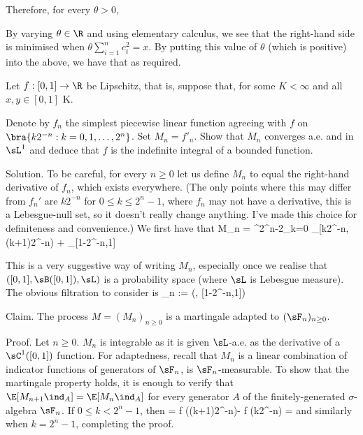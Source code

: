Therefore, for every $\theta > 0$,
\be
\pro{} \leq \exp{}
\ee

By varying $\theta \in \R$ and using elementary calculus, we see that the right-hand side is minimised when $\theta \sum^n_{i=1} c^2_i = x$. By putting this value of $\theta$ (which is positive) into the above, we have that
\be
\pro{} \leq  \exp{}
\ee
as required.

\vspace{2mm}

\qcutline


\item Let $f : [0, 1] \to \R$ be Lipschitz, that is, suppose that, for some $K < \infty$ and all $x, y \in [0, 1]$
\be
{} \leq K.
\ee

Denote by $f_n$ the simplest piecewise linear function agreeing with $f$ on $\bra{k2^{-n} : k = 0, 1, \dots , 2^n}$. Set $M_n = f'_n$. Show that $M_n$ converges a.e. and in $\sL^1$ and deduce that $f$ is the indefinite integral of a bounded function.

\scutline

Solution. To be careful, for every $n \geq 0$ let us define $M_n$ to equal the right-hand derivative of $f_n$, which exists everywhere. (The only points where this may differ from $f_n'$ are $k2^{-n}$ for $0 \leq  k \leq  2^n -1$, where $f_n$ may not have a derivative, this is a Lebesgue-null set, so it doesn't really change anything. I've made this choice for definiteness and convenience.) We first have that
\be
M_n = \sum^{2^n-2}_{k=0}  \cdot \ind_{[k2^{-n},(k+1)2^{-n})} +  \cdot \ind_{[1-2^{-n},1]}
\ee

This is a very suggestive way of writing $M_n$, especially once we realise that $([0,1],\sB([0,1]),\sL)$ is a probability space (where $\sL$ is Lebesgue measure). The obvious filtration to consider is
\be
\sF_n := \sigma(\bra{[k2^{-n}, (k+1)2^{-n}) : 0 \leq  k \leq 2^n-2}, [1-2^{-n},1])
\ee

Claim. The process $M = (M_n)_{n\geq 0}$ is a martingale adapted to $(\sF_n)_{n\geq 0}$.

Proof. Let $n \geq 0$. $M_n$ is integrable as it is given $\sL$-a.e. as the derivative of a $\sC^1([0,1])$ function. For adaptedness, recall that $M_n$ is a linear combination of indicator functions of generators of $\sF_n$, is $\sF_n$-measurable. To show that the martingale property holds, it is enough to verify that $\E[M_{n+1}\ind_A] = \E[M_n\ind_A]$ for every generator $A$ of the finitely-generated $\sigma$-algebra $\sF_n$. If $0 \leq  k < 2^n-1$, then
\be
\E[M_{n+1}\ind_{[k2^{-n},(k+1)2^{-n})}] = f ((k+1)2^{-n})- f (k2^{-n}) = \E[M_n\ind_{[k2-n,(k+1)2-n)}]
\ee
and similarly when $k = 2^n-1$, completing the proof.

